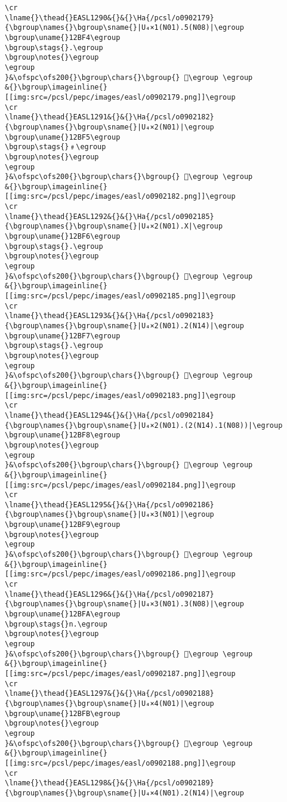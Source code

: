 \begin{verbatim}
\cr
\lname{}\thead{}EASL1290&{}&{}\Ha{/pcsl/o0902179}{\bgroup\names{}\bgroup\sname{}|U₄×1(N01).5(N08)|\egroup
\bgroup\uname{}12BF4\egroup
\bgroup\stags{}.\egroup
\bgroup\notes{}\egroup
\egroup
}&\ofspc\ofs200{}\bgroup\chars{}\bgroup{} 𒯴\egroup \egroup
&{}\bgroup\imageinline{}[[img:src=/pcsl/pepc/images/easl/o0902179.png]]\egroup
\cr
\lname{}\thead{}EASL1291&{}&{}\Ha{/pcsl/o0902182}{\bgroup\names{}\bgroup\sname{}|U₄×2(N01)|\egroup
\bgroup\uname{}12BF5\egroup
\bgroup\stags{}﹟\egroup
\bgroup\notes{}\egroup
\egroup
}&\ofspc\ofs200{}\bgroup\chars{}\bgroup{} 𒯵\egroup \egroup
&{}\bgroup\imageinline{}[[img:src=/pcsl/pepc/images/easl/o0902182.png]]\egroup
\cr
\lname{}\thead{}EASL1292&{}&{}\Ha{/pcsl/o0902185}{\bgroup\names{}\bgroup\sname{}|U₄×2(N01).X|\egroup
\bgroup\uname{}12BF6\egroup
\bgroup\stags{}.\egroup
\bgroup\notes{}\egroup
\egroup
}&\ofspc\ofs200{}\bgroup\chars{}\bgroup{} 𒯶\egroup \egroup
&{}\bgroup\imageinline{}[[img:src=/pcsl/pepc/images/easl/o0902185.png]]\egroup
\cr
\lname{}\thead{}EASL1293&{}&{}\Ha{/pcsl/o0902183}{\bgroup\names{}\bgroup\sname{}|U₄×2(N01).2(N14)|\egroup
\bgroup\uname{}12BF7\egroup
\bgroup\stags{}.\egroup
\bgroup\notes{}\egroup
\egroup
}&\ofspc\ofs200{}\bgroup\chars{}\bgroup{} 𒯷\egroup \egroup
&{}\bgroup\imageinline{}[[img:src=/pcsl/pepc/images/easl/o0902183.png]]\egroup
\cr
\lname{}\thead{}EASL1294&{}&{}\Ha{/pcsl/o0902184}{\bgroup\names{}\bgroup\sname{}|U₄×2(N01).(2(N14).1(N08))|\egroup
\bgroup\uname{}12BF8\egroup
\bgroup\notes{}\egroup
\egroup
}&\ofspc\ofs200{}\bgroup\chars{}\bgroup{} 𒯸\egroup \egroup
&{}\bgroup\imageinline{}[[img:src=/pcsl/pepc/images/easl/o0902184.png]]\egroup
\cr
\lname{}\thead{}EASL1295&{}&{}\Ha{/pcsl/o0902186}{\bgroup\names{}\bgroup\sname{}|U₄×3(N01)|\egroup
\bgroup\uname{}12BF9\egroup
\bgroup\notes{}\egroup
\egroup
}&\ofspc\ofs200{}\bgroup\chars{}\bgroup{} 𒯹\egroup \egroup
&{}\bgroup\imageinline{}[[img:src=/pcsl/pepc/images/easl/o0902186.png]]\egroup
\cr
\lname{}\thead{}EASL1296&{}&{}\Ha{/pcsl/o0902187}{\bgroup\names{}\bgroup\sname{}|U₄×3(N01).3(N08)|\egroup
\bgroup\uname{}12BFA\egroup
\bgroup\stags{}n.\egroup
\bgroup\notes{}\egroup
\egroup
}&\ofspc\ofs200{}\bgroup\chars{}\bgroup{} 𒯺\egroup \egroup
&{}\bgroup\imageinline{}[[img:src=/pcsl/pepc/images/easl/o0902187.png]]\egroup
\cr
\lname{}\thead{}EASL1297&{}&{}\Ha{/pcsl/o0902188}{\bgroup\names{}\bgroup\sname{}|U₄×4(N01)|\egroup
\bgroup\uname{}12BFB\egroup
\bgroup\notes{}\egroup
\egroup
}&\ofspc\ofs200{}\bgroup\chars{}\bgroup{} 𒯻\egroup \egroup
&{}\bgroup\imageinline{}[[img:src=/pcsl/pepc/images/easl/o0902188.png]]\egroup
\cr
\lname{}\thead{}EASL1298&{}&{}\Ha{/pcsl/o0902189}{\bgroup\names{}\bgroup\sname{}|U₄×4(N01).2(N14)|\egroup

\end{verbatim}
